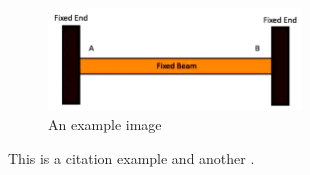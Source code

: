 \documentclass{article}
\begin{document}
\begin{figure}[ht]
    \centering
    \includegraphics[width=0.6\textwidth]{Fixed Beam.png}
    \caption{An example image}
    \label{fig:example}
\end{figure}

This is a citation example \cite{smith2020} and another \cite{doe2018}.
\end{document}
